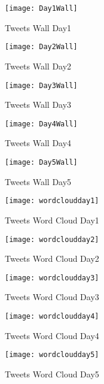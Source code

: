 \begin{figure}[ht]
	\begin{center}
		 \texttt{[image: Day1Wall]}
		  \caption{Tweets Wall Day1}
	 \end{center}
\end{figure}

\begin{figure}[ht]
	\begin{center}
		 \texttt{[image: Day2Wall]}
		  \caption{Tweets Wall Day2}
	 \end{center}
\end{figure}
\begin{figure}[ht]
	\begin{center}
		 \texttt{[image: Day3Wall]}
		  \caption{Tweets Wall Day3}
	 \end{center}
\end{figure}

\begin{figure}[ht]
	\begin{center}
		 \texttt{[image: Day4Wall]}
		  \caption{Tweets Wall Day4}
	 \end{center}
\end{figure}
\begin{figure}[ht]
	\begin{center}
		 \texttt{[image: Day5Wall]}
		  \caption{Tweets Wall Day5}
	 \end{center}
\end{figure}
\begin{figure}[ht]
	\begin{center}
		 \texttt{[image: wordcloudday1]}
		  \caption{Tweets Word Cloud Day1}
	 \end{center}
\end{figure}
\begin{figure}[ht]
	\begin{center}
		 \texttt{[image: wordcloudday2]}
		  \caption{Tweets Word Cloud Day2}
	 \end{center}
\end{figure}
\begin{figure}[ht]
	\begin{center}
		 \texttt{[image: wordcloudday3]}
		  \caption{Tweets Word Cloud Day3}
	 \end{center}
\end{figure}
\begin{figure}[ht]
	\begin{center}
		 \texttt{[image: wordcloudday4]}
		  \caption{Tweets Word Cloud Day4}
	 \end{center}
\end{figure}
\begin{figure}[ht]
	\begin{center}
		 \texttt{[image: wordcloudday5]}
		  \caption{Tweets Word Cloud Day5}
	 \end{center}
\end{figure}

\newpage
